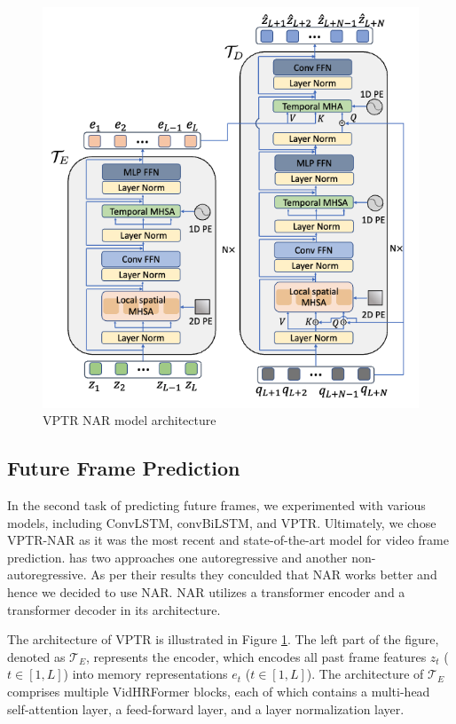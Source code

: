 \documentclass{article}
\begin{document}
\begin{figure}
  \centering
  \includegraphics[scale=0.25]{VPTR_arc.png}
  \caption{VPTR NAR model architecture}
  \label{fig:architecture}
\end{figure}

\subsection{Future Frame Prediction}
In the second task of predicting future frames, we experimented with various models, including 
ConvLSTM, convBiLSTM, and VPTR. Ultimately, we chose VPTR-NAR as it was the most recent and 
state-of-the-art model for video frame prediction. \citet{Ye2022VPTRET} has two approaches one 
autoregressive and another non-autoregressive. As per their results they conculded that
NAR works better and hence we decided to use NAR. NAR utilizes a transformer encoder and a 
transformer decoder in its architecture.

The architecture of VPTR is illustrated in Figure \ref{fig:architecture}. The left part of the 
figure, denoted as $\mathcal{T}_E$, represents the encoder, which encodes all past frame 
features $z_t$ ($t \in [1, L]$) into memory representations $e_t$ ($t \in [1, L]$). The 
architecture of $\mathcal{T}_E$ comprises multiple VidHRFormer blocks, each of which contains a 
multi-head self-attention layer, a feed-forward layer, and a layer normalization layer.
\end{document}

